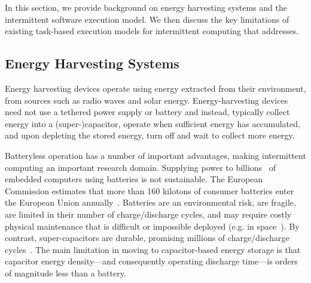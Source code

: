 In this section, we provide background on energy harvesting systems and the intermittent software execution model. We then discuss the key limitations of existing task-based execution models for intermittent computing that \sys addresses.

\subsection{Energy Harvesting Systems}
\label{sec:background_harvesting}

Energy harvesting devices operate using energy extracted from their environment, from sources such as radio waves and solar energy. Energy-harvesting devices need not use a tethered power supply or battery and instead, typically collect energy into a (super-)capacitor, operate when sufficient energy has accumulated, and upon depleting the stored energy, turn off and wait to collect more energy.

Batteryless operation has a number of important advantages, making intermittent computing an important research domain. Supplying power to billions~\cite{gartner_iot} of embedded computers using batteries is not sustainable. The European Commission estimates that more than 160 kilotons of consumer batteries enter the European Union annually~\cite{eu_batteries_2016}. Batteries are an environmental risk, are fragile, are limited in their number of charge/discharge cycles, and may require costly physical maintenance that is difficult or impossible deployed (e.g. in space~\cite{kicksat}). By contrast, super-capacitors are durable, promising millions of charge/discharge cycles~\cite[Sec. I]{ongaro_pwre_2012}. The main limitation in moving to capacitor-based energy storage is that capacitor energy density---and consequently operating discharge time---is orders of magnitude less than a battery. 


